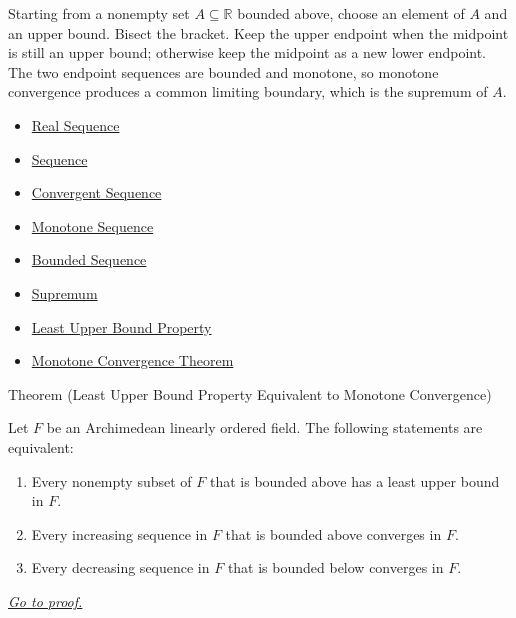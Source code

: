 \begin{remark*}[Interpretation]
Starting from a nonempty set $A\subseteq\mathbb{R}$ bounded above, choose an
element of $A$ and an upper bound. Bisect the bracket. Keep the upper endpoint
when the midpoint is still an upper bound; otherwise keep the midpoint as a
new lower endpoint. The two endpoint sequences are bounded and monotone, so
monotone convergence produces a common limiting boundary, which is the
supremum of $A$.
\end{remark*}

\begin{dependencies}
\begin{itemize}
  \item \hyperref[def:real-sequence]{Real Sequence}
  \item \hyperref[def:sequence]{Sequence}
  \item \hyperref[def:convergent-sequence]{Convergent Sequence}
  \item \hyperref[def:monotone-sequence]{Monotone Sequence}
  \item \hyperref[def:bounded-sequence]{Bounded Sequence}
  \item \hyperref[def:supremum]{Supremum}
  \item \hyperref[def:least-upper-bound-property]{Least Upper Bound Property}
  \item \hyperref[thm:monotone-convergence-theorem]{Monotone Convergence Theorem}
\end{itemize}
\end{dependencies}

\begin{theorembox}{Theorem (Least Upper Bound Property Equivalent to Monotone Convergence)}
\begin{theorem}
\label{thm:lub-property-equivalent-monotone-convergence}
Let $F$ be an Archimedean linearly ordered field.  The following statements are
equivalent:
\begin{enumerate}[label=(\roman*)]
  \item Every nonempty subset of $F$ that is bounded above has a least upper
  bound in $F$.
  \item Every increasing sequence in $F$ that is bounded above converges in
  $F$.
  \item Every decreasing sequence in $F$ that is bounded below converges in
  $F$.
\end{enumerate}

\smallskip
\noindent
\hyperref[prf:lub-property-equivalent-monotone-convergence]{\textit{Go to proof.}}
\end{theorem}
\end{theorembox}

